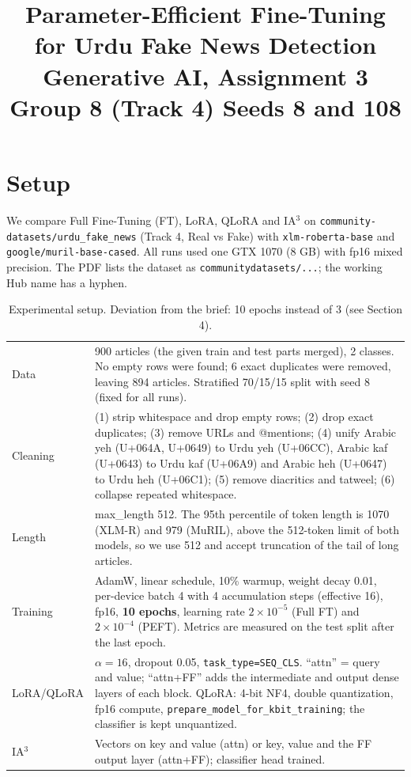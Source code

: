 \documentclass[10pt,a4paper]{article}
\title{\vspace{-1.2cm}\textbf{Parameter-Efficient Fine-Tuning for Urdu Fake News Detection}\\[2pt]
\large Generative AI, Assignment 3 \quad Group 8 (Track 4) \quad Seeds 8 and 108\vspace{-0.4cm}}
\author{}
\date{}
\begin{document}
\maketitle

\section{Setup}
We compare Full Fine-Tuning (FT), LoRA, QLoRA and IA$^3$ on \texttt{community-datasets/urdu\_fake\_news} (Track 4, Real vs Fake) with \texttt{xlm-roberta-base} and \texttt{google/muril-base-cased}. All runs used one GTX 1070 (8 GB) with fp16 mixed precision. The PDF lists the dataset as \texttt{communitydatasets/...}; the working Hub name has a hyphen.

\begin{table}[H]
\centering\small
\begin{tabular}{@{}lp{13.3cm}@{}}
\toprule
Data & 900 articles (the given train and test parts merged), 2 classes. No empty rows were found; 6 exact duplicates were removed, leaving 894 articles. Stratified 70/15/15 split with seed 8 (fixed for all runs). \\
Cleaning & (1) strip whitespace and drop empty rows; (2) drop exact duplicates; (3) remove URLs and @mentions; (4) unify Arabic yeh (U+064A, U+0649) to Urdu yeh (U+06CC), Arabic kaf (U+0643) to Urdu kaf (U+06A9) and Arabic heh (U+0647) to Urdu heh (U+06C1); (5) remove diacritics and tatweel; (6) collapse repeated whitespace. \\
Length & max\_length 512. The 95th percentile of token length is 1070 (XLM-R) and 979 (MuRIL), above the 512-token limit of both models, so we use 512 and accept truncation of the tail of long articles. \\
Training & AdamW, linear schedule, 10\% warmup, weight decay 0.01, per-device batch 4 with 4 accumulation steps (effective 16), fp16, \textbf{10 epochs}, learning rate $2\times10^{-5}$ (Full FT) and $2\times10^{-4}$ (PEFT). Metrics are measured on the test split after the last epoch. \\
LoRA/QLoRA & $\alpha=16$, dropout 0.05, \texttt{task\_type=SEQ\_CLS}. ``attn'' = query and value; ``attn+FF'' adds the intermediate and output dense layers of each block. QLoRA: 4-bit NF4, double quantization, fp16 compute, \texttt{prepare\_model\_for\_kbit\_training}; the classifier is kept unquantized. \\
IA$^3$ & Vectors on key and value (attn) or key, value and the FF output layer (attn+FF); classifier head trained. \\
\bottomrule
\end{tabular}
\caption{Experimental setup. Deviation from the brief: 10 epochs instead of 3 (see Section 4).}
\end{table}
\end{document}
